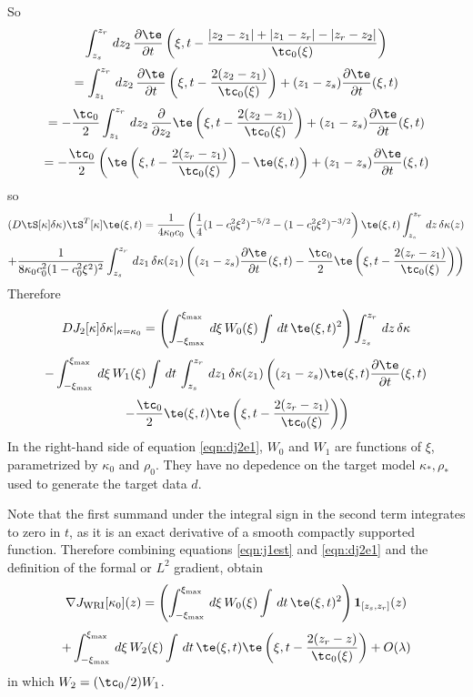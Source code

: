 So
\[
  \int_{z_s}^{z_r} \,dz_2\, \frac{\partial \te}{\partial 
    t}\left(\xi,t -
    \frac{|z_2-z_1|+|z_1-z_r|-|z_r-z_2|}{\tc_0(\xi)}\right) 
\]
\[
  = \int_{z_1}^{z_r} \,dz_2\, \frac{\partial
    \te}{\partial t}\left(\xi,t-\frac{2(z_2-z_1)}{\tc_0(\xi)}\right)
  + (z_1-z_s) \frac{\partial
    \te}{\partial t}(\xi,t)
\]
\[
=-\frac{\tc_0}{2}\int_{z_1}^{z_r} \,dz_2\, \frac{\partial}{\partial z_2}\te\left(\xi,t-\frac{2(z_2-z_1)}{\tc_0(\xi)}\right)
  + (z_1-z_s) \frac{\partial
    \te}{\partial t}(\xi,t)
\]
\[
  = -\frac{\tc_0}{2}\left(\te\left(\xi,t-\frac{2(z_r-z_1)}{\tc_0(\xi)}\right)-\te(\xi,t)\right)
    + (z_1-z_s) \frac{\partial
    \te}{\partial t}(\xi,t)
\]
so 
\[
  ( D\tS[\kappa]\delta \kappa) \tS^T[\kappa]\te(\xi,t) =
  \frac{1}{4\kappa_0c_0}\left(\frac{1}{4}(1-c_0^2\xi^2)^{-5/2}- (1-c_0^2\xi^2)^{-3/2}\right) \te(\xi,t)
  \int_{z_s}^{z_r}\,dz\,\delta \kappa (z)
\]
\begin{equation}
  \label{eqn:dmodhompwst3}
     + \frac{1}{8\kappa_0c_0^2(1-c_0^2\xi^2)^2}
     \int_{z_s}^{z_r}\,dz_1\,\delta\kappa(z_1) \left((z_1-z_s) \frac{\partial
    \te}{\partial t}(\xi,t) -\frac{\tc_0}{2}\te\left(\xi,t-\frac{2(z_r-z_1)}{\tc_0(\xi)}\right)\right)
\end{equation}
Therefore 
\[
  DJ_2[\kappa]\delta \kappa|_{\kappa=\kappa_0} = \left(\int_{-\xi_{\rm max}}^{\xi_{\rm max}}\,d\xi \,W_0(\xi)
  \int\,dt\, \te(\xi,t)^2\right)\int_{z_s}^{z_r}\,dz\,\delta \kappa
\]
\[
     -\int_{-\xi_{\rm max}}^{\xi_{\rm max}}\,d\xi\,W_1(\xi)\int\,dt\, \int_{z_s}^{z_r}\,dz_1\,\delta\kappa(z_1) \left((z_1-z_s) \te(\xi,t)\frac{\partial 
         \te}{\partial t}(\xi,t) \right.
     \]
\begin{equation}
  \label{eqn:dj2e1}
 \left.    -\frac{\tc_0}{2}\te(\xi,t)\te\left(\xi,t-\frac{2(z_r-z_1)}{\tc_0(\xi)}\right)\right)
\end{equation}
In the right-hand side of equation \ref{eqn:dj2e1}, $W_0$ and $W_1$
are functions of $\xi$, parametrized by $\kappa_0$ and $\rho_0$. They
have no depedence on the target model $\kappa_*,\rho_*$ used to
generate the target data $d$.

Note that the first summand under the integral sign in the second term
integrates to zero in $t$, as it is an exact derivative of a smooth
compactly supported function. Therefore combining equations
\ref{eqn:j1est} and \ref{eqn:dj2e1} and the definition of the formal
or $L^2$ gradient, obtain
\[
  \nabla J_{\rm WRI}[\kappa_0](z) = \left(\int_{-\xi_{\rm max}}^{\xi_{\rm max}}\,d\xi \,W_0(\xi)
    \int\,dt\, \te(\xi,t)^2\right) {\bf 1}_{[z_s,z_r]}(z)
\]
\begin{equation}
  \label{eqn:gradwri1}
  +\int_{-\xi_{\rm max}}^{\xi_{\rm max}}\,d\xi\,W_2(\xi)\int\,dt\, 
  \te(\xi,t)\te\left(\xi,t-\frac{2(z_r-z)}{\tc_0(\xi)}\right) + O(\lambda)
\end{equation}
in which $W_2 = (\tc_0/2)W_1$.

